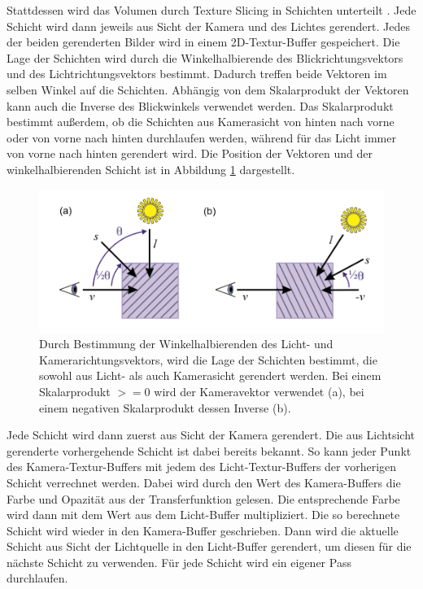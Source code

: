 Stattdessen wird das Volumen durch Texture Slicing in Schichten unterteilt \cite{Hadwiger06}. Jede Schicht wird dann jeweils aus Sicht der Kamera und des Lichtes gerendert. Jedes der beiden gerenderten Bilder wird in einem 2D-Textur-Buffer gespeichert. 
Die Lage der Schichten wird durch die Winkelhalbierende des Blickrichtungsvektors und des Lichtrichtungsvektors bestimmt. Dadurch treffen beide Vektoren im selben Winkel auf die Schichten. Abhängig von dem Skalarprodukt der Vektoren kann auch die Inverse des Blickwinkels verwendet werden. Das Skalarprodukt bestimmt außerdem, ob die Schichten aus Kamerasicht von hinten nach vorne oder von vorne nach hinten durchlaufen werden, während für das Licht immer von vorne nach hinten gerendert wird.
Die Position der Vektoren und der winkelhalbierenden Schicht ist in Abbildung \ref{img:halfAngleSlice} dargestellt.
	
\begin{figure}[!htb]
	\centering
	\includegraphics[width=0.7\linewidth]{images/halfAngleSlice.png}
	\caption{Durch Bestimmung der Winkelhalbierenden des Licht- und Kamerarichtungsvektors, wird die Lage der Schichten bestimmt, die sowohl aus Licht- als auch Kamerasicht gerendert werden. Bei einem Skalarprodukt $>=0$ wird der Kameravektor verwendet (a), bei einem negativen Skalarprodukt dessen Inverse (b).}
	\label{img:halfAngleSlice}
\end{figure}
\FloatBarrier

Jede Schicht wird dann zuerst aus Sicht der Kamera gerendert. Die aus Lichtsicht gerenderte vorhergehende Schicht ist dabei bereits bekannt. So kann jeder Punkt des Kamera-Textur-Buffers mit jedem des Licht-Textur-Buffers der vorherigen Schicht verrechnet werden. Dabei wird durch den Wert des Kamera-Buffers die Farbe und Opazität aus der Transferfunktion gelesen. Die entsprechende Farbe wird dann mit dem Wert aus dem Licht-Buffer multipliziert. Die so berechnete Schicht wird wieder in den Kamera-Buffer geschrieben. Dann wird die aktuelle Schicht aus Sicht der Lichtquelle in den Licht-Buffer gerendert, um diesen für die nächste Schicht zu verwenden.
Für jede Schicht wird ein eigener Pass durchlaufen.

